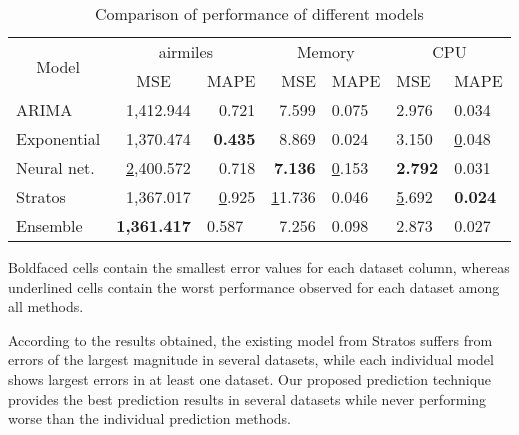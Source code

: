 \begin{table}[]
\centering
\caption{Comparison of performance of different models}
\label{my-label}
\begin{tabular}{|l|r|r|r|l|l|l|}
\hline
\multicolumn{1}{|c|}{\multirow{2}{*}{Model}} & \multicolumn{2}{c|}{airmiles}                                            & \multicolumn{2}{c|}{Memory}      & \multicolumn{2}{c|}{CPU}            \\ \cline{2-7} 
\multicolumn{1}{|c|}{}                       & \multicolumn{1}{c|}{MSE}                  & \multicolumn{1}{c|}{MAPE}    & MSE              & MAPE          & MSE              & MAPE             \\ \hline
ARIMA                                        & 1,412.944                               & 0.721                      & 7.599          & 0.075       & 2.976          & 0.034          \\ \hline
Exponential                                  & 1,370.474                               & \textbf{0.435}             & 8.869          & 0.024       & 3.150          & {\ul 0.048}    \\ \hline
Neural net.                                  & {\ul 2,400.572}                         & 0.718                      & \textbf{7.136} & {\ul 0.153} & \textbf{2.792} & 0.031          \\ \hline
Stratos                                      & 1,367.017                               & {\ul 0.925}                & {\ul 11.736}   & 0.046       & {\ul 5.692}    & \textbf{0.024} \\ \hline
Ensemble                                     & \multicolumn{1}{l|}{\textbf{1,361.417}} & \multicolumn{1}{l|}{0.587} & 7.256          & 0.098       & 2.873          & 0.027          \\ \hline
\end{tabular}
\end{table}

Boldfaced cells contain the smallest error values for each dataset column, whereas underlined cells contain the worst performance observed for each dataset among all methods.

According to the results obtained, the existing model from Stratos suffers from errors of the largest magnitude in several datasets, while each individual model shows largest errors in at least one dataset. Our proposed prediction technique provides the best prediction results in several datasets while never performing worse than the individual prediction methods.